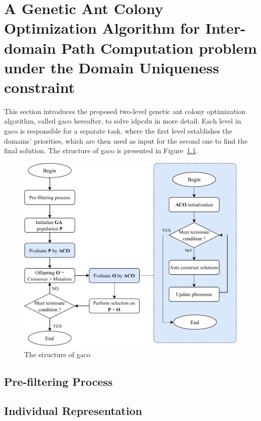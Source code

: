 \chapter{A Genetic Ant Colony Optimization Algorithm for Inter-domain Path Computation problem under the Domain Uniqueness constraint}
\label{chap:chap3}
This section introduces the proposed two-level genetic ant colony optimization algorithm, called \acrshort{gaco} hereafter, to solve \gls{idpcdu} in more detail. Each level in \acrshort{gaco} is responsible for a separate task, where the first level establishes the domains' priorities, which are then used as input for the second one to find the final solution. The structure of \acrshort{gaco} is presented in Figure~\ref{fig:flowchart}.

\setlength{\intextsep}{3pt}
\renewcommand{\scalefigure}{1}
\begin{figure}[htbp]
	\centering
	\includegraphics[scale=\scalefigure]{Figures/chap 3/Flowchart.pdf}
	\caption{The structure of \acrshort{gaco}}
	\label{fig:flowchart}
\end{figure}

\section{Pre-filtering Process}
\label{proposed:prefiltering}


\section{Individual Representation}
\label{proposed:encoding}


